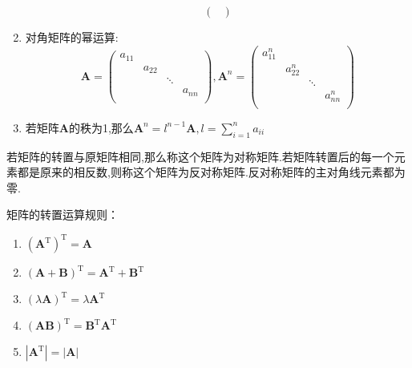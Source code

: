 \begin{enumerate}
\begin{equation*}
\begin{pmatrix}
            \end{pmatrix}
    \end{equation*}
    \item 对角矩阵的幂运算:
    \begin{equation*}
        \mathbf{A} =\begin{pmatrix}
        a_{11}   &      &      &      \\
           &   a_{22}   &      &      \\
           &      &   \ddots   &      \\
           &      &      &   a_{nn}   \\
        \end{pmatrix},
        \mathbf{A}^n=\begin{pmatrix}
            a_{11}^n   &      &      &      \\
               &   a_{22}^n   &      &      \\
               &      &   \ddots   &      \\
               &      &      &   a_{nn}^n   \\
            \end{pmatrix}
    \end{equation*}
    \item 若矩阵$\mathbf{A}$的秩为1,那么$\mathbf{A}^n=l^{n-1}\mathbf{A},l=\sum_{i=1}^{n} a_{ii}$

\end{enumerate}

\begin{definition}
    若矩阵的转置与原矩阵相同,那么称这个矩阵为对称矩阵.若矩阵转置后的每一个元素都是原来的相反数,则称这个矩阵为反对称矩阵.反对称矩阵的主对角线元素都为零.
\end{definition}

矩阵的转置运算规则：
\begin{enumerate}
    \item $(\mathbf{A}^\mathrm{T})^\mathrm{T}=\mathbf{A}$
    \item $(\mathbf{A}+\mathbf{B})^\mathrm{T}=\mathbf{A}^\mathrm{T}+\mathbf{B}^\mathrm{T}$
    \item $(\lambda \mathbf{A})^\mathrm{T}=\lambda \mathbf{A}^\mathrm{T}$
    \item $(\mathbf{A}\mathbf{B})^\mathrm{T}=\mathbf{B}^\mathrm{T}\mathbf{A}^\mathrm{T}$
    \item $\left\lvert \mathbf{A}^\mathrm{T} \right\rvert=\left\lvert \mathbf{A} \right\rvert$
\end{enumerate}
